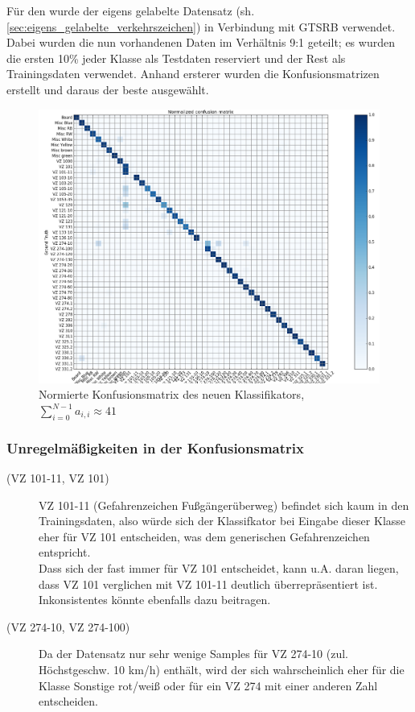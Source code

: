 \documentclass[12pt,a4paper,ngerman,enabledeprecatedfontcommands]{scrreprt}
\begin{document}
Für den  wurde der eigens gelabelte Datensatz (sh. \cref{sec:eigens_gelabelte_verkehrszeichen}) in Verbindung mit GTSRB verwendet. Dabei wurden die nun vorhandenen Daten im Verhältnis 9:1 geteilt; es wurden die ersten 10\% jeder Klasse als Testdaten reserviert und der Rest als Trainingsdaten verwendet. Anhand ersterer wurden die Konfusionsmatrizen erstellt und daraus der beste  ausgewählt.

\begin{figure}[H]
\centering
\includegraphics[width=1\linewidth]{Reviewdokument/Grafiken/konfusionsmatrix.png}
\caption{Normierte Konfusionsmatrix des neuen Klassifikators, $\sum\limits_{i=0}^{N-1}a_{i,i} \approx 41$}
\label{fig:konfusionsmatrix}
\end{figure}

\subsubsection*{Unregelmäßigkeiten in der Konfusionsmatrix}
\begin{description}
    \item[(\gls{VZ} 101-11, \gls{VZ} 101)] \gls{VZ} 101-11 (Gefahrenzeichen Fußgängerüberweg) befindet sich kaum in den Trainingsdaten, also würde sich der Klassifkator bei Eingabe dieser Klasse eher für \gls{VZ} 101 entscheiden, was dem generischen Gefahrenzeichen entspricht.\\
    Dass sich der  fast immer für \gls{VZ} 101 entscheidet, kann u.A. daran liegen, dass \gls{VZ} 101 verglichen mit \gls{VZ} 101-11 deutlich überrepräsentiert ist. Inkonsistentes  könnte ebenfalls dazu beitragen.
    \item[(\gls{VZ} 274-10, \gls{VZ} 274-100)] Da der Datensatz nur sehr wenige \gls{Sample}s für \gls{VZ} 274-10 (zul. Höchstgeschw. 10 km/h) enthält, wird der  sich wahrscheinlich eher für die Klasse \glqq{}Sonstige rot/weiß\grqq{} oder für ein \gls{VZ} 274 mit einer anderen Zahl entscheiden.
\end{description}
\smallskip
\end{document}
